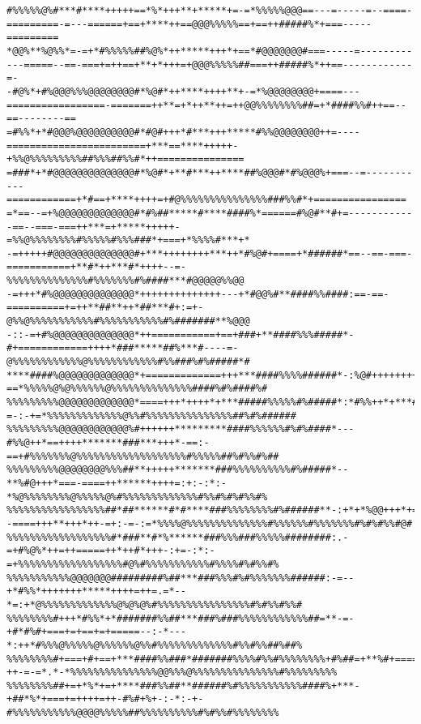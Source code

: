 \documentclass[a4paper, 12pt, oneside]{article}
\begin{document}
\begin{verbatim}
#%%%%%@%#***#****+++++==*%*+++**+*****+=-=*%%%%%@@@==---=-----=--====-=========-=---======+==+****++==@@@%%%%%==+==++#####%*+===-----=========
*@@%**%@%%*=-=+*#%%%%%##%@%*++*****+++*+==*#@@@@@@@#===-----=------------=====--==-===+=++==+**+*+++=+@@@%%%%%##===++#####%*++==------------=-
-#@%*+#%@@@%%%@@@@@@@@#*%@#*++****++++**+-=*%@@@@@@@@+====---=================-=======++**=+*++**++=++@@%%%%%%%%##=+*####%%#++==--==--------==
=#%%*+*#@@@%@@@@@@@@@@#*#@#+++*#***+++*****#%%@@@@@@@@++=----========================+***==****+++++-+%%@%%%%%%%%%##%%%##%%#*++===============
=###*+*#@@@@@@@@@@@@@@#*%@#*+**#***++****##%@@@#*#%@@@%+===--=-----------============+*#==+****++++=+#@%%%%%%%%%%%%%%%###%%#*+================
=*==--=+%@@@@@@@@@@@@@#*#%##*****#****####%*======#%@#**#+=------------==--===-===++***=+*****+++++-=%%@%%%%%%%%#%%%%%#%%%###*+===+*%%%%#***+*
-=+++++#@@@@@@@@@@@@@@#+***++++++++***++*#%@#+====+*######*==--==-===-===========+**#*++***#*++++--=-%%%%%%%%%%%%%%#%%%%%%%#%####***#@@@@@%%@@
-=+++*#%@@@@@@@@@@@@@@*++++++++++++++---+*#@@%#**####%%####:==-==-==========+=++**##**++*##***#+:=+-@%%@%%%%%%%%%%%#%%%%%%%%%%%#%#######**%@@@
-::-=+#%@@@@@@@@@@@@@@*++===========+==+###+**####%%%#####*-#+============++++*###*****##%***#----=-@%%%%%%%%%%%%@%%%%%%%%%%%%#%%###%#%#####*#
****####%@@@@@@@@@@@@@*+=============+++***####%%%%######*-:%@#+++++++++***########**##%#***#-:=-==*%%%%%@%@%%%%%%@%%%%%%%%%%%%%%####%#%####%#
%%%%%%%%%@@@@@@@@@@@@@*====+++*++++*+***#####%%%%%#%#####*:*#%%++*+***#############%%##*++*-=-:-+=*%%%%%%%%%%%%%@%%#%%%%%%%%%%%%%%%##%#%######
%%%%%%%%%@@@@@@@@@@@@%#++++++*********####%%%%%%#%#%####*---#%%@++*==++++*******###***+++*-==:-==+#%%%%%%%@%%%%%%%%%%%%%%%%%%%#%%%%%##%#%%#%##
%%%%%%%%%@@@@@@@@%%%##**+++++*******###%%%%%%%%%%#%#####*--**%#@+++*===-====++******++++=:+:-:*:-*%@%%%%%%%%@%%%%%@%#%%%%%%%%%%%%%#%%#%#%#%%#%
%%%%%%%%%%%%%%%%%##*##******#*#****###%%%%%%%%#%######**-:+*+*%@@+++*+=--====+++**+++*++-=+:-=-:=*%%%%@%%%%%%%%%%%%%%#%%%%%%#%%%%%%%#%#%#%%#@#
%%%%%%%%%%%%%%%%%%#*###**#*%******###%%%###%%%%%########:.-=+#%@%*++=++=====++*++#*+++-:+=-:*:-=+%%%%%%%%%%%%%%%%%%#@%#%%%%%%%%%%%#%%%%#%#%%#%
%%%%%%%%%%%@@@@@@@#########%##***###%%%#%#%%%%%%%######:-=--+*#%%*+++++++*****++++=++=.=*--*=:+*@%%%%%%%%%%%%%@%@%@%#%%%%%%%%%%%%%%%%#%#%%#%%#
%%%%%%%%#+++*#%%*+*#######%%##***###%###%%%%%%%%%%%%##=**-=-+#*#%#+===+=+==+=+=====--:-*---*:++*#%%%@%%%%%@%%%%%%@%%#%%%%%%%%%%%%%#%%#%%##%##%
%%%%%%%%#+===+#+==+***####%%###*#######%%%%#%%#%%%%%%%%+#%##=+**%#+====++=======+*+#-++-=-=*.*-*%%%%%%%%%%%%%%%@@%%%@%%%%%%%%%%%%%%%#%%%%%%%%%
%%%%%%%%##+=+*%*+=+****###%%##**######%#%%%%%%%%%%%####%+***-+##*%*+===+=++++=++-#%#+%+-:-*:-+-#%%%%%%%%%%%@@@@%%%%%##%%%%%%%%%%#%#%%#%%%%%%%%

\end{verbatim}
\end{document}
